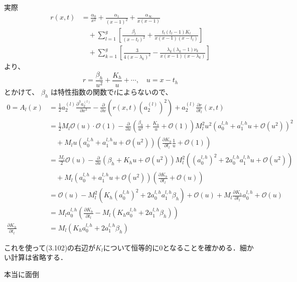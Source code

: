 実際
\begin{align*}
    r(x,t) &= \frac{\alpha_0}{x^2} + \frac{\alpha_1}{(x-1)^2} + \frac{\alpha_\infty}{x(x-1)} \nonumber \\
    &\quad + \sum_{l=1}^g \left[ \frac{\beta_l}{(x-t_l)^2} + \frac{t_l(t_l-1)K_l}{x(x-1)(x-t_l)} \right]\\
    &\quad + \sum_{k=1}^g \left[ \frac{3}{4(x-\lambda_k)^2} - \frac{\lambda_k(\lambda_k-1)\nu_k}{x(x-1)(x-\lambda_k)} \right] 
\end{align*}
より、
\begin{equation*}
    r = \frac{\beta_h}{u^2} + \frac{K_h}{u} + \cdots, \quad u = x - t_h
\end{equation*}
とかけて、 $\beta_h$ は特性指数の関数で$t$によらないので、
\begin{align*}
    0 = A_l(x) &= \frac{1}{2} a_2^{(l)} \frac{\partial^3 a_2^{(l)}}{\partial x^3} - \frac{\partial}{\partial x} \left( r(x,t) (a_2^{(l)})^2 \right) + a_2^{(l)} \frac{\partial r}{\partial t_l}(x,t) \\
    &= \frac{1}{2} M_l \mathcal{O}(u) \cdot \mathcal{O}(1) - \frac{\partial}{\partial x} \left( \frac{\beta_h}{u^2} + \frac{K_h}{u} + \mathcal{O}(1) \right) M_l^2 u^2 (a_0^{l,h} + a_1^{l,h} u + \mathcal{O}(u^2))^2 \\
    &\quad + M_l u (a_0^{l,h} + a_1^{l,h} u + \mathcal{O}(u^2)) \left( \frac{\partial K_h}{\partial t_l} \frac{1}{u} + \mathcal{O}(1) \right) \\
    &= \frac{M_l}{2} \mathcal{O}(u) - \frac{\partial}{\partial x} \left( \beta_h + K_h u + \mathcal{O}(u^2) \right) M_l^2 \left( (a_0^{l,h})^2 + 2 a_0^{l,h} a_1^{l,h} u + \mathcal{O}(u^2) \right) \\
    &\quad + M_l (a_0^{l,h} + a_1^{l,h} u + \mathcal{O}(u^2)) \left( \frac{\partial K_h}{\partial t_l} + \mathcal{O}(u) \right) \\
    &= \mathcal{O}(u) - M_l^2 \left( K_h (a_0^{l,h})^2 + 2 a_0^{l,h} a_1^{l,h} \beta_h \right) + \mathcal{O}(u) + M_l \frac{\partial K_h}{\partial t_l} a_0^{l,h} + \mathcal{O}(u) \\
    &= M_l a_0^{l,h} \left( \frac{\partial K_h}{\partial t_l} - M_l \left( K_h a_0^{l,h} + 2 a_1^{l,h} \beta_h \right) \right) \\
    \frac{\partial K_h}{\partial t_l} &= M_l \left( K_h a_0^{l,h} + 2 a_1^{l,h} \beta_h \right)
\end{align*}
\begin{story}
これを使って(3.102)の右辺が$K_l$について恒等的に0となることを確かめる．細かい計算は省略する．
\end{story}
本当に面倒